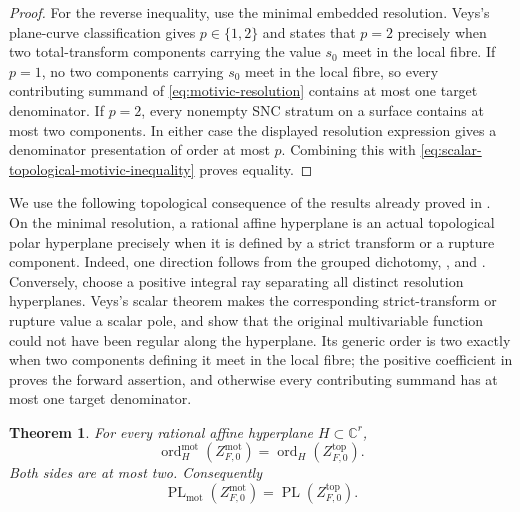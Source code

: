 \documentclass[12pt]{amsart}
\numberwithin{equation}{section}
\theoremstyle{plain}
\newtheorem{theorem}{Theorem}[section]
\theoremstyle{definition}
\theoremstyle{remark}
\theoremstyle{definition}
\DeclareMathOperator{\PL}{PL}
\DeclareMathOperator{\ord}{ord}
\newcommand{\C}{\mathbb C}
\newcommand{\motzeta}{Z^{\mathrm{mot}}_{F,0}}
\begin{document}
\begin{proof}
For the reverse inequality, use the minimal embedded resolution. Veys's plane-curve classification \cite[Theorems~4.2--4.3]{Veys1995} gives $p\in\{1,2\}$ and states that $p=2$ precisely when two total-transform components carrying the value $s_0$ meet in the local fibre. If $p=1$, no two components carrying $s_0$ meet in the local fibre, so every contributing summand of \eqref{eq:motivic-resolution} contains at most one target denominator. If $p=2$, every nonempty SNC stratum on a surface contains at most two components. In either case the displayed resolution expression gives a denominator presentation of order at most $p$. Combining this with \eqref{eq:scalar-topological-motivic-inequality} proves equality.
\end{proof}

We use the following topological consequence of the results already proved in . On the minimal resolution, a rational affine hyperplane is an actual topological polar hyperplane precisely when it is defined by a strict transform or a rupture component. Indeed, one direction follows from the grouped dichotomy, , and . Conversely, choose a positive integral ray separating all distinct resolution hyperplanes. Veys's scalar theorem makes the corresponding strict-transform or rupture value a scalar pole, and  show that the original multivariable function could not have been regular along the hyperplane. Its generic order is two exactly when two components defining it meet in the local fibre; the positive coefficient in  proves the forward assertion, and otherwise every contributing summand has at most one target denominator.

\begin{theorem}\label{thm:plane-motivic-comparison}
For every rational affine hyperplane $H\subset\C^r$,
\begin{equation}\label{eq:plane-motivic-order-equality}
 \ord_H^{\mathrm{mot}}(\motzeta)=\ord_H(Z^{\mathrm{top}}_{F,0}).
\end{equation}
Both sides are at most two. Consequently
\begin{equation*}
\PL_{\mathrm{mot}}(\motzeta)=\PL(Z^{\mathrm{top}}_{F,0}).
\end{equation*}
\end{theorem}
\end{document}
